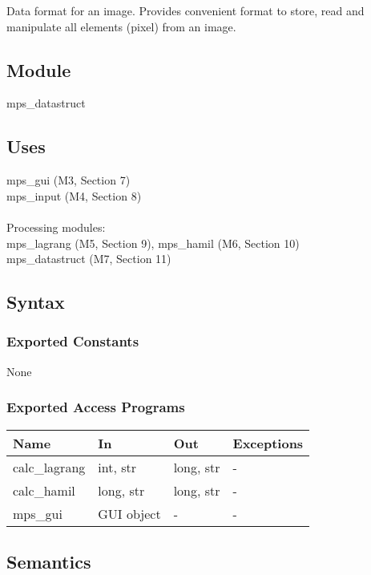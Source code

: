 \documentclass[12pt, titlepage]{article}
\begin{document}
Data format for an image. Provides convenient format to store, read and 
manipulate all elements (pixel) from an image.

\subsection{Module}

mps\_datastruct

\subsection{Uses}

mps\_gui (M3, Section 7)\\
mps\_input (M4, Section 8)\\\\
Processing modules:\\
mps\_lagrang (M5, Section 9), mps\_hamil (M6, Section 10)\\
mps\_datastruct (M7, Section 11)\\

\subsection{Syntax}

\subsubsection{Exported Constants}

None

\subsubsection{Exported Access Programs}

\begin{center}
\begin{tabular}{p{2cm} p{4cm} p{4cm} p{2cm}}
\hline
\textbf{Name} & \textbf{In} & \textbf{Out} & \textbf{Exceptions} \\
\hline
calc\_lagrang & int, str & long, str & - \\
calc\_hamil & long, str & long, str & - \\
mps\_gui & GUI object & - & - \\
\hline
\end{tabular}
\end{center}

\subsection{Semantics}
\end{document}
